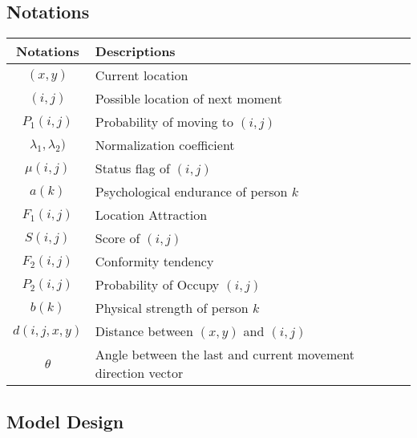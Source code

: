 \documentclass{mcmthesis}
\begin{document}
\subsection{Notations}
\begin{table}[htbp]
	\begin{tabular}{@{}cl@{}}
		\toprule
		Notations                & Descriptions                                         \\ \midrule
		\((x,y)\)                & Current location                                  \\
		\((i,j)\)                & Possible location of next moment                            \\
		\(P_1(i,j)\)             & Probability of moving to \((i,j)\)                   \\
	\(\lambda_1,\lambda_2)\) & Normalization coefficient                            \\
	\(\mu(i,j)\)             & Status flag of \((i,j)\)                             \\
	\(a(k)\)                 & Psychological endurance of person \(k\)              \\
	\(F_1(i,j)\)             & Location Attraction                                  \\
	\(S(i,j)\)               & Score of \((i,j)\)                                   \\
	\(F_2(i,j)\)             & Conformity tendency                                  \\
	\(P_2(i,j)\)            & Probability of Occupy \((i,j)\)                      \\
	\(b(k)\)                 & Physical strength of person \(k\)                             \\
	\(d(i,j,x,y)\)           & Distance between \((x,y)\) and \((i,j)\)                  \\
	\(\theta\)               & Angle between the last and current movement direction vector\\
	\bottomrule
\end{tabular}
\end{table}
\subsection {Model Design}
\end{document}
